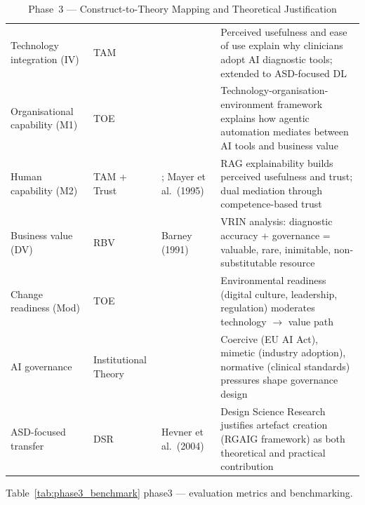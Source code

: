 \begingroup\singlespacing\tablefontsize\tablestripes
\begin{xltabular}{\textwidth}{@{} p{0.16\textwidth} p{0.12\textwidth} X X @{}}
\caption{Phase~3 --- Construct-to-Theory Mapping and Theoretical Justification}
\label{tab:phase3_theory}\\
\toprule
{} &  &  &  \\
\midrule
\endfirsthead
\endhead
\bottomrule
\endlastfoot
Technology integration (IV)  & TAM  & \citet{davis1989tam}  & Perceived usefulness and ease of use explain why clinicians adopt AI diagnostic tools; extended to ASD-focused DL \\
\addlinespace
Organisational capability (M1) & TOE & \citet{tornatzky1990processes} & Technology-organisation-environment framework explains how agentic automation mediates between AI tools and business value \\
\addlinespace
Human capability (M2) & TAM + Trust & \citet{davis1989tam}; Mayer et al.\ (1995) & RAG explainability builds perceived usefulness and trust; dual mediation through competence-based trust \\
\addlinespace
Business value (DV) & RBV & Barney (1991) & VRIN analysis: diagnostic accuracy + governance = valuable, rare, inimitable, non-substitutable resource \\
\addlinespace
Change readiness (Mod) & TOE & \citet{tornatzky1990processes} & Environmental readiness (digital culture, leadership, regulation) moderates technology $\rightarrow$ value path \\
\addlinespace
AI governance & Institutional Theory & \citet{dimaggio1983iron} & Coercive (EU AI Act), mimetic (industry adoption), normative (clinical standards) pressures shape governance design \\
\addlinespace
ASD-focused transfer & DSR & Hevner et al.\ (2004) & Design Science Research justifies artefact creation (RGAIG framework) as both theoretical and practical contribution \\
\end{xltabular}
\endgroup

\vspace{1.5em}

\begingroup\singlespacing\tablefontsize\tablestripes
\noindent Table~\ref{tab:phase3_benchmark} phase3 --- evaluation metrics and benchmarking.

